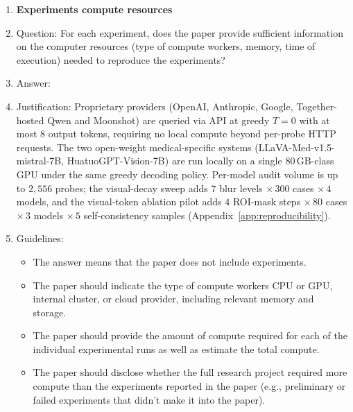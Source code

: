 \documentclass{article}
\begin{document}
\begin{enumerate}
\item {\bf Experiments compute resources}
    \item[] Question: For each experiment, does the paper provide sufficient information on the computer resources (type of compute workers, memory, time of execution) needed to reproduce the experiments?
    \item[] Answer: \answerYes{}
    \item[] Justification: Proprietary providers (OpenAI, Anthropic, Google, Together-hosted Qwen and Moonshot) are queried via API at greedy $T{=}0$ with at most $8$ output tokens, requiring no local compute beyond per-probe HTTP requests. The two open-weight medical-specific systems (LLaVA-Med-v1.5-mistral-7B, HuatuoGPT-Vision-7B) are run locally on a single 80\,GB-class GPU under the same greedy decoding policy. Per-model audit volume is up to $2{,}556$ probes; the visual-decay sweep adds $7$ blur levels $\times\,300$ cases $\times\,4$ models, and the visual-token ablation pilot adds $4$ ROI-mask steps $\times\,80$ cases $\times\,3$ models $\times\,5$ self-consistency samples (Appendix~\ref{app:reproducibility}).
    \item[] Guidelines:
    \begin{itemize}
        \item The answer \answerNA{} means that the paper does not include experiments.
        \item The paper should indicate the type of compute workers CPU or GPU, internal cluster, or cloud provider, including relevant memory and storage.
        \item The paper should provide the amount of compute required for each of the individual experimental runs as well as estimate the total compute.
        \item The paper should disclose whether the full research project required more compute than the experiments reported in the paper (e.g., preliminary or failed experiments that didn't make it into the paper).
    \end{itemize}


\end{enumerate}
\end{document}
